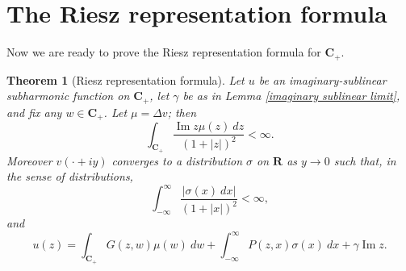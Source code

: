 \documentclass[12pt]{report}
\newcommand{\RR}{\mathbf{R}}
\newcommand{\CC}{\mathbf{C}}
\renewcommand{\Im}{\operatorname{Im}}
\newtheorem{theorem}{Theorem}[chapter]
\theoremstyle{definition}
\theoremstyle{remark}
\begin{document}
\section{The Riesz representation formula}
Now we are ready to prove the Riesz representation formula for $\CC_+$.
\begin{theorem}[Riesz representation formula]
    Let $u$ be an imaginary-sublinear subharmonic function on $\CC_+$, let $\gamma$ be as in Lemma \ref{imaginary sublinear limit}, and fix any $w \in \CC_+$. Let $\mu = \Delta v$; then
    \begin{equation}\label{estimate on mu}\int_{\CC_+} \frac{\Im z \mu(z) ~dz}{(1 + |z|)^2} < \infty.\end{equation}
    Moreover $v(\cdot + iy)$ converges to a distribution $\sigma$ on $\RR$ as $y \to 0$ such that, in the sense of distributions,
\begin{equation}\label{estimate on sigma}\int_{-\infty}^\infty \frac{|\sigma(x) ~dx|}{(1 + |x|)^2} < \infty,\end{equation}
    and
\begin{equation}\label{riesz formula}u(z) = \int_{\CC_+} G(z, w) \mu(w) ~dw + \int_{-\infty}^\infty P(z, x) \sigma(x) ~dx + \gamma \Im z.\end{equation}
\end{theorem}
\end{document}
